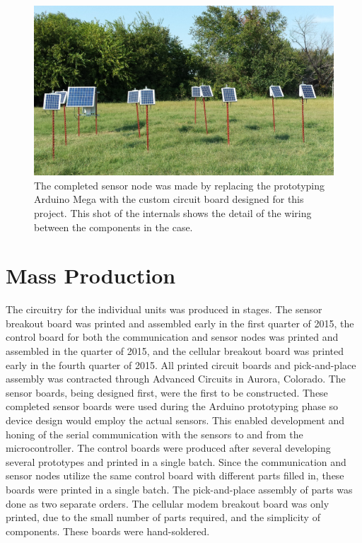 \documentclass[numbook, envcountsect, envcountsame, envcountreset, runningheads, twocolumn]{svjour3}
\begin{document}
		\begin{figure}[!t]
			\centering
			\includegraphics[width=.8\columnwidth,height=0.8\columnwidth,keepaspectratio]{testdeploy2.jpg}
			\caption[Internals of sensor node]{The completed sensor node was made by replacing the prototyping Arduino Mega with the custom circuit board designed for this project.  This shot of the internals shows the detail of the wiring between the components in the case.\label{fig:testdeploy2}}
		\end{figure}
		
	\section{Mass Production}
	
		The circuitry for the individual units was produced in stages.  The sensor breakout board was printed and assembled early in the first quarter of 2015, the control board for both the communication and sensor nodes was printed and assembled in the  quarter of 2015, and the cellular breakout board was printed early in the fourth quarter of 2015.  All printed circuit boards and pick-and-place assembly was contracted through Advanced Circuits in Aurora, Colorado.  The sensor boards, being designed first, were the first to be constructed.  These completed sensor boards were used during the Arduino prototyping phase so device design would employ the actual sensors.  This enabled development and honing of the serial communication with the sensors to and from the microcontroller.  The control boards were produced after several developing several prototypes and printed in a single batch.  Since the communication and sensor nodes utilize the same control board with different parts filled in, these boards were printed in a single batch.  The pick-and-place assembly of parts was done as two separate orders.  The cellular modem breakout board was only printed, due to the small number of parts required, and the simplicity of components.  These boards were hand-soldered.
		
\end{document}
